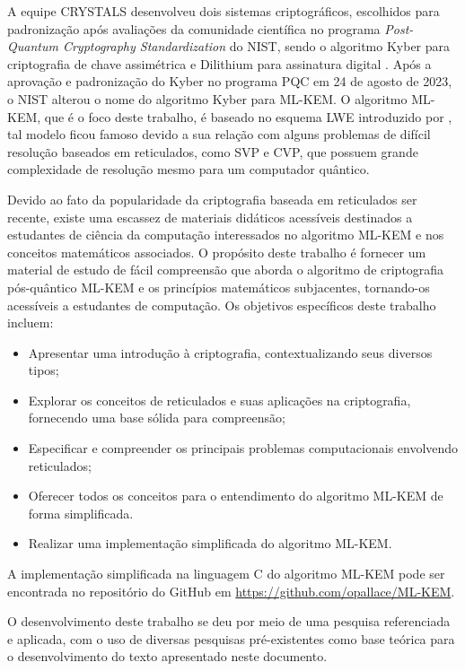 A equipe \ac{CRYSTALS} desenvolveu dois sistemas criptográficos, escolhidos para padronização após avaliações da comunidade científica no programa \textit{Post-Quantum Cryptography Standardization} do \ac{NIST}, sendo o algoritmo Kyber para criptografia de chave assimétrica e Dilithium para assinatura digital \cite{nist3}. Após a aprovação e padronização do Kyber no programa PQC em 24 de agosto de 2023, o \ac{NIST} alterou o nome do algoritmo Kyber para \ac{ML-KEM}. O algoritmo \ac{ML-KEM}, que é o foco deste trabalho, é baseado no esquema \ac{LWE} introduzido por \cite{regev}, tal modelo ficou famoso devido a sua relação com alguns problemas de difícil resolução baseados em reticulados, como \ac{SVP} e \ac{CVP}, que possuem grande complexidade de resolução mesmo para um computador quântico.

Devido ao fato da popularidade da criptografia baseada em reticulados ser recente, existe uma escassez de materiais didáticos acessíveis destinados a estudantes de ciência da computação interessados no algoritmo \ac{ML-KEM} e nos conceitos matemáticos associados. O propósito deste trabalho é fornecer um material de estudo de fácil compreensão que aborda o algoritmo de criptografia pós-quântico \ac{ML-KEM} e os princípios matemáticos subjacentes, tornando-os acessíveis a estudantes de computação. Os objetivos específicos deste trabalho incluem:

\noindent
\begin{itemize}
    \item Apresentar uma introdução à criptografia, contextualizando seus diversos tipos;
    \item Explorar os conceitos de reticulados e suas aplicações na criptografia, fornecendo uma base sólida para compreensão;
    \item Especificar e compreender os principais problemas computacionais envolvendo reticulados;
    \item Oferecer todos os conceitos para o entendimento do algoritmo \ac{ML-KEM} de forma simplificada. 
    \item Realizar uma implementação simplificada do algoritmo \ac{ML-KEM}.
\end{itemize}

A implementação simplificada na linguagem C do algoritmo ML-KEM pode ser encontrada no repositório do GitHub em \url{https://github.com/opallace/ML-KEM}.

O desenvolvimento deste trabalho se deu por meio de uma pesquisa referenciada e aplicada, com o uso de diversas pesquisas pré-existentes como base teórica para o desenvolvimento do texto apresentado neste documento.

